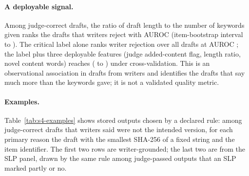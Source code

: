 \paragraph{A deployable signal.}
Among judge-correct drafts, the ratio of draft length to the number of keywords given ranks the drafts that writers reject with AUROC \jmwmLenAuc{} (item-bootstrap interval \jmwmLenAucLo{} to \jmwmLenAucHi{}).
The critical label alone ranks writer rejection over all drafts at AUROC \jmwmCritAuc{}; the label plus three deployable features (judge added-content flag, length ratio, novel content words) reaches \jmwmCritPlusAuc{} (\jmwmCritPlusAucLo{} to \jmwmCritPlusAucHi{}) under cross-validation.
This is an observational association in \jmwmAllN{} drafts from \jmpOneEightWriters{} writers and identifies the drafts that say much more than the keywords gave; it is not a validated quality metric.

\paragraph{Examples.}
Table~\ref{tab:s4-examples} shows stored outputs chosen by a declared rule: among judge-correct drafts that writers said were not the intended version, for each primary reason the draft with the smallest SHA-256 of a fixed string and the item identifier.
The first two rows are writer-grounded; the last two are from the SLP panel, drawn by the same rule among judge-passed outputs that an SLP marked partly or no.

